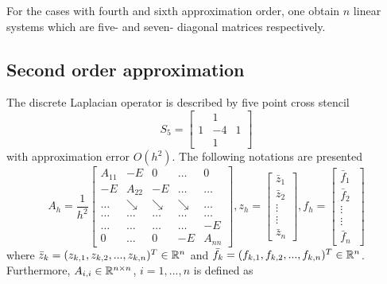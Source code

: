 \documentclass[11pt,a4paper,twoside]{article}
\begin{document}
For the cases with fourth and sixth approximation order, one obtain $n$ linear systems which are five- and seven- diagonal matrices respectively.
\iffalse
\subsection{Second order approximation}

The discrete Laplacian operator is described by five point cross stencil
\[
S_5 = 
\begin{bmatrix}
            &  1  &  \\
    1     &  -4    & 1\\
            &  1  &  
\end{bmatrix}
\]
with approximation error $O(h^2)$. The following notations are presented
\[
A_h = \frac{1}{h^2}
\begin{bmatrix}
    A_{11}       & -E          &  0              & \dots & 0 \\
    -E               & A_{22}  & -E              & \dots & \dots  \\
      \dots         & \searrow     & \searrow  & \searrow  & \dots  \\
      \dots         & \dots     & \dots         & \dots   &    \dots  \\
      \dots         & \dots    & \dots         & \dots & -E  \\
     0                 & \dots   &  0               & -E    & A_{nn}
\end{bmatrix}
,
z_h = 
\begin{bmatrix}
    \bar z_{1} \\
    \bar z_{2}  \\
    \vdots  \\
    \vdots  \\
    \bar z_{n}
\end{bmatrix}
,
f_h = 
\begin{bmatrix}
    \bar f_{1} \\
    \bar f_{2}  \\
    \vdots  \\
    \vdots  \\
    \bar f_{n}\
\end{bmatrix}
\]
where $\bar z_k = (z_{k,1}, z_{k,2}, ..., z_{k,n})^T\in \mathbb{R}^{n}$ and $\bar f_k = (f_{k,1}, f_{k,2}, ..., f_{k,n})^T\in \mathbb{R}^{n}$. Furthermore, $A_{i,i} \in \mathbb{R}^{n \times n}$, $i = 1, ..., n$ is defined as
\end{document}
